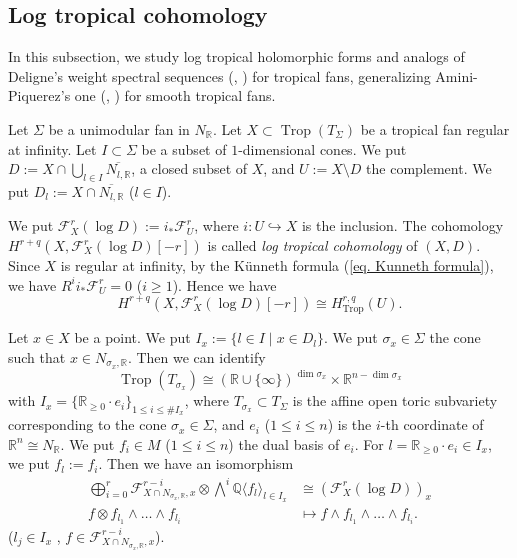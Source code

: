 \documentclass[12pt,a4]{amsart}
\def\R{\mathbb{R}}
\def\Q{\mathbb{Q}}
\def\F{\mathscr{F}}
\def\Trop{\mathop{\mathrm{trop}}\nolimits}
\def\Trop{\mathop{\mathrm{Trop}}\nolimits}
\numberwithin{equation}{section}
\numberwithin{figure}{section}
\begin{document}
   
 \subsection{Log tropical cohomology}\label{subsec log tropical cohomology}
  In this subsection, we study log tropical holomorphic forms and analogs of Deligne's weight spectral sequences
  (\cite{DeligneThoriedeHodgeII1972}, 
  \cite[Chapter 4]{PetersSteenbrinkMixedHodgestructures2008})
   for tropical fans, 
  generalizing Amini-Piquerez's one 
  (\cite{AminiPiquerezHomologyoftropicalfans2021},  \cite{AminiPiquerezHomologicalsmoothnessandDeligneresolutionfortropicalfans2024})
  for smooth tropical fans.

  Let $\Sigma$ be a unimodular fan in $N_\R$.
  Let $X \subset \Trop (T_\Sigma)$ be a tropical fan regular at infinity.
  Let $I \subset \Sigma$ be a subset of $1$-dimensional cones.
  We put $D:= X\cap \bigcup_{l\in I} \overline{N_{l,\R}}$, a closed subset of $X$,
  and $U:= X \setminus D$ the complement.
  We put $D_l := X \cap \overline{N_{l,\R}}$ ($l \in I$).

   We put $\F^r_X (\log D) :=i_* \F^r_U$, where $i \colon U \hookrightarrow X$ is the inclusion.
   The cohomology $ H^{r+q} (X, \F^r_X (\log D) [-r])   $ 
   is called 
   \emph{log tropical cohomology} of $(X,D)$.
  Since $X$ is regular at infinity, 
  by the K\"{u}nneth formula (\ref{eq. Kunneth formula}), 
  we have  
  $R^i i_* \F^r_U  =0$
   ($i \geq 1$).
  Hence  we have 
  $$ H^{r+q} (X, \F^r_X (\log D)[-r]) \cong H^{r,q}_{\Trop} (U).$$

  Let $x \in X$ be a point. We put
   $I_x := \{ l \in I  \mid x \in D_l \}$.
  We put $\sigma_x \in \Sigma$ the cone such that $x \in N_{\sigma_x,\R}$.
  Then we can identify 
  $$\Trop (T_{\sigma_x}) 
     \cong (\R \cup \{ \infty \})^{\dim \sigma_x  }
      \times \R^{n -\dim \sigma_x }$$
  with 
  $I_x = \{  \R_{\geq 0} \cdot e_i \}_{1\leq i \leq \# I_x }$, 
  where 
   $T_{\sigma_x} \subset T_{\Sigma}$ is the affine open toric subvariety corresponding to the cone $\sigma_x \in \Sigma$, 
   and 
  $e_i $ ($1\leq i \leq n$) is the $i$-th coordinate 
   of $\R^n \cong N_\R$.
  We put $f_i \in M$ ($1\leq i \leq n$) the dual basis of $e_i$.
  For $l =\R_{\geq 0} \cdot e_i\in I_x$,
  we put $f_l:= f_i$.
  Then we have an isomorphism 
  \begin{equation}
  \begin{aligned}
  \bigoplus_{ i=0}^r 
  \F^{r-i}_{X \cap N_{\sigma_x,\R},x}
   \otimes  
  \bigwedge^i \Q \langle f_l \rangle_{l \in I_x}  
  & 
   \cong (\F^r_X (\log D))_x  
   \\
  f  \otimes  f_{l_1}\wedge \dots \wedge f_{l_{i}} 
  & \mapsto
    f \wedge f_{l_1}\wedge \dots \wedge f_{l_{i}} 
   \label{log Fp local description} .
  \end{aligned}
  \end{equation}
  ($l_j \in I_x $ , $f \in \F^{r-i}_{X \cap N_{\sigma_x,\R},x}$).
  
\end{document}
